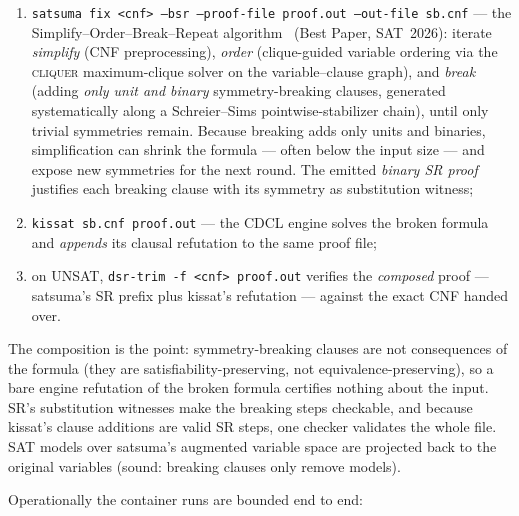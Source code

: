 \documentclass[10pt]{article}
\begin{document}
\begin{enumerate}
\item \texttt{satsuma fix <cnf> --bsr --proof-file proof.out --out-file sb.cnf}
  --- the Simplify--Order--Break--Repeat algorithm~\cite{sbr} (Best
  Paper, SAT~2026): iterate \emph{simplify} (CNF preprocessing),
  \emph{order} (clique-guided variable ordering via the
  \textsc{cliquer} maximum-clique solver on the variable--clause
  graph), and \emph{break} (adding \emph{only unit and binary}
  symmetry-breaking clauses, generated systematically along a
  Schreier--Sims pointwise-stabilizer chain), until only trivial
  symmetries remain. Because breaking adds only units and binaries,
  simplification can shrink the formula --- often below the input
  size --- and expose new symmetries for the next round. The emitted
  \emph{binary SR proof} justifies each breaking clause with its
  symmetry as substitution witness;
\item \texttt{kissat sb.cnf proof.out} --- the CDCL engine solves the
  broken formula and \emph{appends} its clausal refutation to the same
  proof file;
\item on UNSAT, \texttt{dsr-trim -f <cnf> proof.out} verifies the
  \emph{composed} proof --- satsuma's SR prefix plus kissat's
  refutation --- against the exact CNF handed over.
\end{enumerate}

The composition is the point: symmetry-breaking clauses are not
consequences of the formula (they are satisfiability-preserving, not
equivalence-preserving), so a bare engine refutation of the broken
formula certifies nothing about the input. SR's substitution witnesses
make the breaking steps checkable, and because kissat's clause
additions are valid SR steps, one checker validates the whole file.
SAT models over satsuma's augmented variable space are projected back
to the original variables (sound: breaking clauses only remove
models).

Operationally the container runs are bounded end to end:
\end{document}
